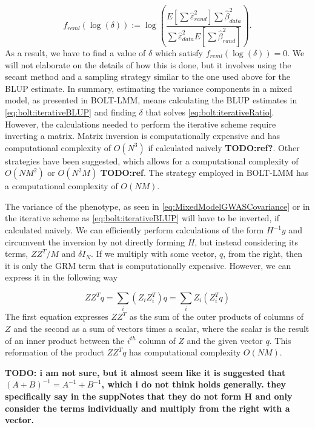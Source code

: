 \begin{equation}\label{eq:bolt:iterativeRatio}
f_{reml}(\log(\delta)) 
:= \log 
\left(
\dfrac
{
E\left[ \sum \hat{\varepsilon}^2_{rand} \right]	
\sum \hat{\beta}^2_{data}
}
{
\sum \hat{\varepsilon}^2_{data}
E\left[ \sum \hat{\beta}^2_{rand} \right]
}
\right).
\end{equation}
As a result, we have to find a value of $ \delta $ which satisfy $ f_{reml}(\log(\delta)) = 0$. We will not elaborate on the details 
of how this is done, but it involves using the secant method and a sampling strategy similar to the one used above for the BLUP 
estimate. In summary, estimating the variance components in a mixed model, as presented in BOLT-LMM, means calculating the BLUP 
estimates in \cref{eq:bolt:iterativeBLUP} and finding $ \delta $ that solves \cref{eq:bolt:iterativeRatio}. However, the calculations 
needed to perform the iterative scheme require inverting a matrix. Matrix inversion is computationally expensive and has computational 
complexity of $ O(N^3) $ if calculated naively \textbf{TODO:ref?}. Other strategies have been suggested, which allows for a 
computational complexity of $ O(NM^2) $ or $ O(N^2M) $ \textbf{TODO:ref}. The strategy employed in BOLT-LMM has a computational 
complexity of $ O(NM) $. 

The variance of the phenotype, as seen in \cref{eq:MixedModelGWASCovariance} or in the iterative scheme as 
\cref{eq:bolt:iterativeBLUP} will have to be inverted, if calculated naively. We can efficiently perform calculations of the form $ 
H^{-1}y $ and circumvent the inversion by not directly forming $ H $, but instead considering its terms, $ ZZ^T / M$ and $ \delta I_N 
$. If we multiply with some vector, $ q $, from the right, then it is only the GRM term that is computationally expensive. However, we 
can express it in the following way

\begin{equation}
ZZ^T q = \sum_i \left( Z_i Z_i^T\right) q = \sum_i  Z_i \left(Z_i^T q\right) 
\end{equation}
The first equation expresses $ Z Z^T $ as the sum of the outer products of columns of $ Z $ and the second as a sum of vectors times a 
scalar, where the scalar is the result of an inner product between the $ i^{th} $ column of $ Z $ and the given vector $ q $. This 
reformation of the product $ Z Z^T q$ has computational complexity $ O(NM) $.

\textbf{TODO: i am not sure, but it almost seem like it is suggested that $ (A + B)^{-1} = A^{-1} + B^{-1} $, which i do not think 
holds generally. they specifically say in the suppNotes that they do not form H and only consider the terms individually and multiply 
from the right with a vector.}


